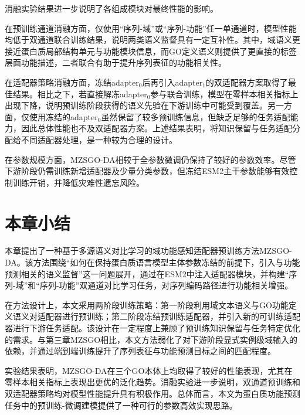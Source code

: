 消融实验结果进一步说明了各组成模块对最终性能的影响。

在预训练通道消融方面，仅使用“序列-域”或“序列-功能”任一单通道时，模型性能均低于双通道联合训练结果，说明两类语义监督具有一定互补性。其中，域语义更接近蛋白质局部结构单元与功能模块信息，而GO定义语义则提供了更直接的标签层面功能描述，二者联合有助于提升序列表征的功能相关性。

在适配器策略消融方面，冻结adapter$_0$后再引入adapter$_1$的双适配器方案取得了最佳结果。相比之下，若直接解冻adapter$_0$参与联合训练，模型在零样本相关指标上出现下降，说明预训练阶段获得的语义先验在下游训练中可能受到覆盖。另一方面，仅使用冻结的adapter$_0$虽然保留了较多预训练信息，但缺乏足够的任务适配能力，因此总体性能也不及双适配器方案。上述结果表明，将知识保留与任务适配分配给不同适配器处理，是一种较为合理的设计。

在参数规模方面，MZSGO-DA相较于全参数微调仍保持了较好的参数效率。尽管下游阶段仍需训练新增适配器及少量分类参数，但冻结ESM2主干参数能够有效控制训练开销，并降低灾难性遗忘风险。

\section{本章小结}

本章提出了一种基于多源语义对比学习的域功能感知适配器预训练方法MZSGO-DA。该方法围绕“如何在保持蛋白质语言模型主体参数冻结的前提下，引入与功能预测相关的语义监督”这一问题展开，通过在ESM2中注入适配器模块，并构建“序列-域”和“序列-功能”双通道对比学习任务，对序列编码路径进行功能相关增强。

在方法设计上，本文采用两阶段训练策略：第一阶段利用域文本语义与GO功能定义语义对适配器进行预训练；第二阶段冻结预训练适配器，并引入新的可训练适配器进行下游任务适配。该设计在一定程度上兼顾了预训练知识保留与任务特定优化的需求。与第三章MZSGO相比，本文方法弱化了对下游阶段显式实例级域输入的依赖，并通过端到端训练提升了序列表征与功能预测目标之间的匹配程度。

实验结果表明，MZSGO-DA在三个GO本体上均取得了较好的性能表现，尤其在零样本相关指标上表现出更优的泛化趋势。消融实验进一步说明，双通道预训练和双适配器策略均对模型性能提升具有积极作用。总体而言，本文为蛋白质功能预测任务中的预训练-微调建模提供了一种可行的参数高效实现思路。